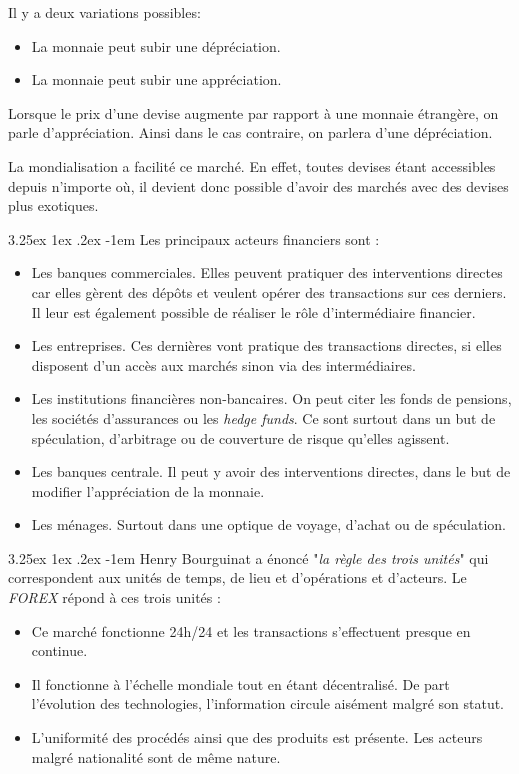 \documentclass[a4paper, 11pt]{article}
\makeatletter
\renewcommand\paragraph{\@startsection{paragraph}{5}{\z@}%
  {3.25ex \@plus1ex \@minus.2ex}%
  {-1em}%
  {\normalfont\normalsize\bfseries}}
\makeatother
\begin{document}
Il y a deux variations possibles:
\begin{itemize}
\item La monnaie peut subir une dépréciation.
\item La monnaie peut subir une appréciation.
\end{itemize}
Lorsque le prix d'une devise augmente par rapport à une monnaie étrangère, on parle d'appréciation. Ainsi dans le cas contraire, on parlera d'une dépréciation.

La mondialisation a facilité ce marché. En effet, toutes devises étant accessibles depuis n'importe où, il devient donc possible d'avoir des marchés avec des devises plus exotiques.

\paragraph{}
Les principaux acteurs financiers sont \cite{marche_des_changes}:
\begin{itemize}
\item Les banques commerciales. Elles peuvent pratiquer des interventions directes car elles gèrent des dépôts et veulent opérer des transactions sur ces derniers. Il leur est également possible de réaliser le rôle d'intermédiaire financier.
\item Les entreprises. Ces dernières vont pratique des transactions directes, si elles disposent d'un accès aux marchés sinon via des intermédiaires.
\item Les institutions financières non-bancaires. On peut citer les fonds de pensions, les sociétés d'assurances ou les \textit{hedge funds}. Ce sont surtout dans un but de spéculation, d'arbitrage ou de couverture de risque qu'elles agissent.
\item Les banques centrale. Il peut y avoir des interventions directes, dans le but de modifier l'appréciation de la monnaie.
\item Les ménages. Surtout dans une optique de voyage, d'achat ou de spéculation.
\end{itemize}

\paragraph{}
Henry Bourguinat a énoncé "\textit{la règle des trois unités}" qui correspondent aux unités de temps, de lieu et d'opérations et d'acteurs.
Le \textit{FOREX} répond à ces trois unités \cite{site_fr_forex}:
\begin{itemize}
\item Ce marché fonctionne 24h/24 et les transactions s'effectuent presque en continue.
\item Il fonctionne à l'échelle mondiale tout en étant décentralisé. De part l'évolution des technologies, l'information circule aisément malgré son statut.
\item L'uniformité des procédés ainsi que des produits est présente. Les acteurs malgré nationalité sont de même nature.
\end{itemize}
\end{document}
